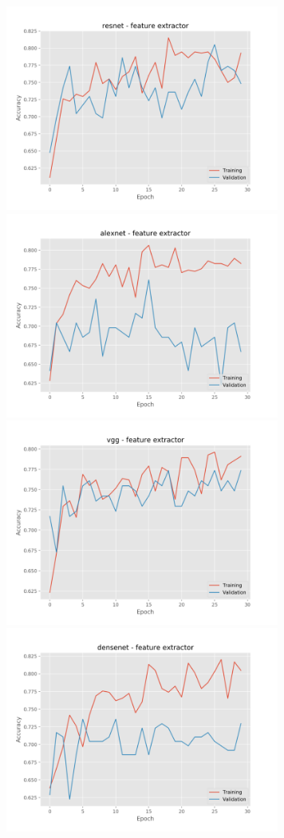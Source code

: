 \documentclass[]{kththesis}
\begin{document}
  \begin{figure}[h]
    \includegraphics[width=9cm]{f_a_resnet_fe}
    \includegraphics[width=9cm]{f_a_alexnet_fe}
    \includegraphics[width=9cm]{f_a_vgg_fe}
    \includegraphics[width=9cm]{f_a_densenet_fe}

\end{figure}
\end{document}
